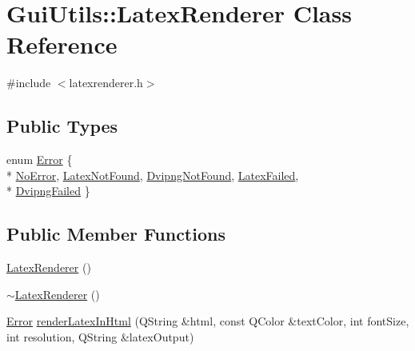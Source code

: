 \hypertarget{classGuiUtils_1_1LatexRenderer}{\section{Gui\+Utils\+:\+:Latex\+Renderer Class Reference}
\label{classGuiUtils_1_1LatexRenderer}
}


{\ttfamily \#include $<$latexrenderer.\+h$>$}

\subsection*{Public Types}
\begin{DoxyCompactItemize}
\item 
enum \hyperlink{classGuiUtils_1_1LatexRenderer_a2cdeccb3a8a7b62e3f78d029ac05d49b}{Error} \{ \\*
\hyperlink{classGuiUtils_1_1LatexRenderer_a2cdeccb3a8a7b62e3f78d029ac05d49ba6f7b1049b057be642910dc794d9893b2}{No\+Error}, 
\hyperlink{classGuiUtils_1_1LatexRenderer_a2cdeccb3a8a7b62e3f78d029ac05d49bad39bbb9585c97fd7d77cb5da55d79b2e}{Latex\+Not\+Found}, 
\hyperlink{classGuiUtils_1_1LatexRenderer_a2cdeccb3a8a7b62e3f78d029ac05d49ba0c87c33dcb40f302d7cc6d41f022ad2b}{Dvipng\+Not\+Found}, 
\hyperlink{classGuiUtils_1_1LatexRenderer_a2cdeccb3a8a7b62e3f78d029ac05d49ba63514e260dd2c752763af68fcece96eb}{Latex\+Failed}, 
\\*
\hyperlink{classGuiUtils_1_1LatexRenderer_a2cdeccb3a8a7b62e3f78d029ac05d49bace3aab0475809e8c07ad37c11f0d9aea}{Dvipng\+Failed}
 \}
\end{DoxyCompactItemize}
\subsection*{Public Member Functions}
\begin{DoxyCompactItemize}
\item 
\hyperlink{classGuiUtils_1_1LatexRenderer_a979c98d7441eda9404acc091cf8a6fd6}{Latex\+Renderer} ()
\item 
\hyperlink{classGuiUtils_1_1LatexRenderer_ae211a4c42e6ab932fc8e2d7c79b9277f}{$\sim$\+Latex\+Renderer} ()
\item 
\hyperlink{classGuiUtils_1_1LatexRenderer_a2cdeccb3a8a7b62e3f78d029ac05d49b}{Error} \hyperlink{classGuiUtils_1_1LatexRenderer_a49c843453726163f49d8d8b7bdb57f8c}{render\+Latex\+In\+Html} (Q\+String \&html, const Q\+Color \&text\+Color, int font\+Size, int resolution, Q\+String \&latex\+Output)
\end{DoxyCompactItemize}
